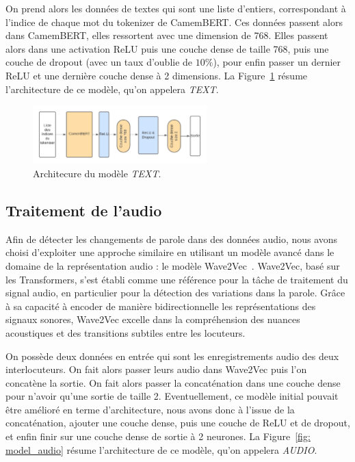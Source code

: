 \documentclass[a4paper]{article}
\begin{document}
On prend alors les données de textes qui sont une liste d'entiers, correspondant 
à l'indice de chaque mot du tokenizer de CamemBERT. Ces données passent alors dans CamemBERT, elles ressortent avec une dimension de
768. Elles passent alors dans une activation ReLU puis une couche dense de taille 768, puis une couche de dropout (avec un taux
d'oublie de $10\%$), pour enfin passer un dernier ReLU et une dernière couche dense à 2 dimensions. 
La Figure~\ref{fig: model_text} résume l'architecture de ce modèle, qu'on appelera \textit{TEXT}.

\begin{figure}[H]
    \centering
    \includegraphics[width=0.6\textwidth]{model_text.png}
    \caption{Architecure du modèle \textit{TEXT}.}
    \label{fig: model_text}
\end{figure}

\subsection{Traitement de l'audio}

Afin de détecter les changements de parole dans des données audio, nous avons choisi d'exploiter une approche similaire en utilisant
un modèle avancé dans le domaine de la représentation audio : le modèle Wave2Vec~\cite{wav2vec}. Wave2Vec, basé sur les Transformers, s'est établi
comme une référence pour la tâche de traitement du signal audio, en particulier pour la détection des variations dans la parole.
Grâce à sa capacité à encoder de manière bidirectionnelle les représentations des signaux sonores, Wave2Vec excelle dans la
compréhension des nuances acoustiques et des transitions subtiles entre les locuteurs. 

On possède deux données en entrée qui sont les enregistrements audio des deux interlocuteurs. On fait alors passer leurs audio dans
Wave2Vec puis l'on concatène la sortie. On fait alors passer la concaténation dans une couche dense pour n'avoir qu'une sortie de
taille 2.
Eventuellement, ce modèle initial pouvait être amélioré en terme d'architecture, nous avons donc à l'issue de la concaténation,
ajouter une couche dense, puis une couche de ReLU et de dropout, et enfin finir sur une couche dense de sortie à 2 neurones. 
La Figure~\ref{fig: model_audio} résume l'architecture de ce modèle, qu'on appelera \textit{AUDIO}.
\end{document}
